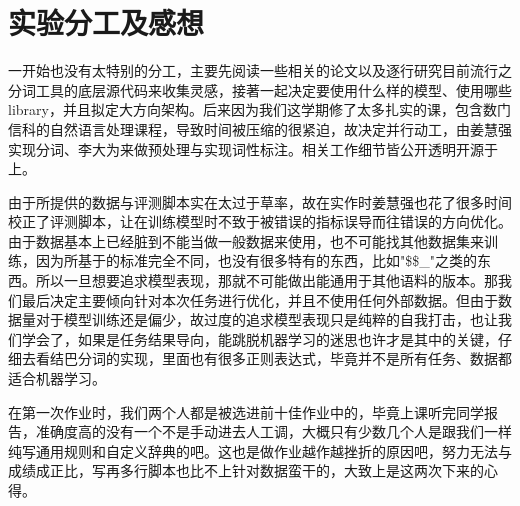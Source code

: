 \section{实验分工及感想}
\label{sec:conclusion}

一开始也没有太特别的分工，主要先阅读一些相关的论文以及逐行研究目前流行之分词工具的底层源代码来收集灵感，接著一起决定要使用什么样的模型、使用哪些 library，并且拟定大方向架构。后来因为我们这学期修了太多扎实的课，包含数门信科的自然语言处理课程，导致时间被压缩的很紧迫，故决定并行动工，由姜慧强实现分词、李大为来做预处理与实现词性标注。相关工作细节皆公开透明开源于  上。

由于所提供的数据与评测脚本实在太过于草率，故在实作时姜慧强也花了很多时间校正了评测脚本，让在训练模型时不致于被错误的指标误导而往错误的方向优化。由于数据基本上已经脏到不能当做一般数据来使用，也不可能找其他数据集来训练，因为所基于的标准完全不同，也没有很多特有的东西，比如"\$\$\_"之类的东西。所以一旦想要追求模型表现，那就不可能做出能通用于其他语料的版本。那我们最后决定主要倾向针对本次任务进行优化，并且不使用任何外部数据。但由于数据量对于模型训练还是偏少，故过度的追求模型表现只是纯粹的自我打击，也让我们学会了，如果是任务结果导向，能跳脱机器学习的迷思也许才是其中的关键，仔细去看结巴分词的实现，里面也有很多正则表达式，毕竟并不是所有任务、数据都适合机器学习。

在第一次作业时，我们两个人都是被选进前十佳作业中的，毕竟上课听完同学报告，准确度高的没有一个不是手动进去人工调，大概只有少数几个人是跟我们一样纯写通用规则和自定义辞典的吧。这也是做作业越作越挫折的原因吧，努力无法与成绩成正比，写再多行脚本也比不上针对数据蛮干的，大致上是这两次下来的心得。